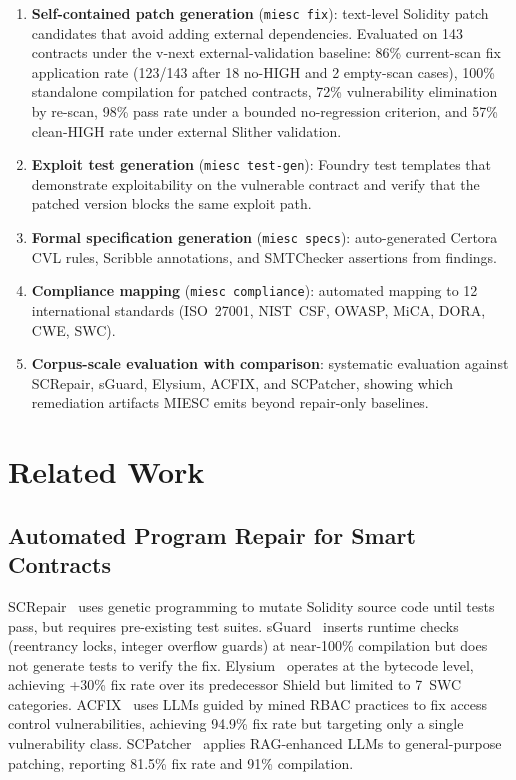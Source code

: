 \documentclass[conference]{IEEEtran}
\begin{document}
\begin{enumerate}
    \item \textbf{Self-contained patch generation} (\texttt{miesc fix}): text-level Solidity patch candidates that avoid adding external dependencies. Evaluated on 143 contracts under the v-next external-validation baseline: 86\% current-scan fix application rate (123/143 after 18 no-HIGH and 2 empty-scan cases), 100\% standalone compilation for patched contracts, 72\% vulnerability elimination by re-scan, 98\% pass rate under a bounded no-regression criterion, and 57\% clean-HIGH rate under external Slither validation.
    \item \textbf{Exploit test generation} (\texttt{miesc test-gen}): Foundry test templates that demonstrate exploitability on the vulnerable contract and verify that the patched version blocks the same exploit path.
    \item \textbf{Formal specification generation} (\texttt{miesc specs}): auto-generated Certora CVL rules, Scribble annotations, and SMTChecker assertions from findings.
    \item \textbf{Compliance mapping} (\texttt{miesc compliance}): automated mapping to 12 international standards (ISO~27001, NIST~CSF, OWASP, MiCA, DORA, CWE, SWC).
    \item \textbf{Corpus-scale evaluation with comparison}: systematic evaluation against SCRepair, sGuard, Elysium, ACFIX, and SCPatcher, showing which remediation artifacts MIESC emits beyond repair-only baselines.
\end{enumerate}

\section{Related Work}

\subsection{Automated Program Repair for Smart Contracts}

SCRepair~\cite{screpair2020} uses genetic programming to mutate Solidity source code until tests pass, but requires pre-existing test suites. sGuard~\cite{nguyen2021sguard} inserts runtime checks (reentrancy locks, integer overflow guards) at near-100\% compilation but does not generate tests to verify the fix. Elysium~\cite{elysium2022} operates at the bytecode level, achieving +30\% fix rate over its predecessor Shield but limited to 7~SWC categories. ACFIX~\cite{acfix2024} uses LLMs guided by mined RBAC practices to fix access control vulnerabilities, achieving 94.9\% fix rate but targeting only a single vulnerability class. SCPatcher~\cite{scpatcher2025} applies RAG-enhanced LLMs to general-purpose patching, reporting 81.5\% fix rate and 91\% compilation.
\end{document}
